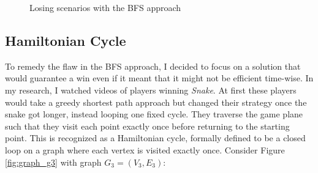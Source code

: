 \documentclass[12pt]{article}
\begin{document}
\begin{figure}[!h]
\centering
	\hspace{1.15em}
	\caption{Losing scenarios with the BFS approach}
	\label{fig:bfs_issues}
\end{figure}

\subsection{Hamiltonian Cycle}

To remedy the flaw in the BFS approach, I decided to focus on a solution that would guarantee a win even if it meant that it might not be efficient time-wise. In my research, I watched videos of players winning \textit{Snake}. At first these players would take a greedy shortest path approach but changed their strategy once the snake got longer, instead looping one fixed cycle. They traverse the game plane such that they visit each point exactly once before returning to the starting point. This is recognized as a Hamiltonian cycle, formally defined to be a closed loop on a graph where each vertex is visited exactly once. Consider Figure \ref{fig:graph_g3} with graph $G_{3} = (V_{3}, E_{3})$:
\end{document}
